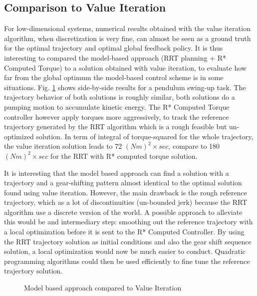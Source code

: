 \subsection{Comparison to Value Iteration}

For low-dimensional systems, numerical results obtained with the value iteration algorithm, when discretization is very fine, can almost be seen as a ground truth for the optimal trajectory and optimal global feedback policy. It is thus interesting to compared the model-based approach (RRT planning + R* Computed Torque) to a solution obtained with value iteration, to evaluate how far from the global optimum the model-based control scheme is in some situations. Fig. \ref{fig:vs} shows side-by-side results for a pendulum swing-up task. The trajectory behavior of both solutions is roughly similar, both solutions do a pumping motion to accumulate kinetic energy. The R* Computed Torque controller however apply torques more aggressively, to track the reference trajectory generated by the RRT algorithm which is a rough feasible but un-optimized solution. In term of integral of torque-squared for the whole trajectory, the value iteration solution leads to 72 $\left(Nm\right)^2 \times sec$, compare to 180 $\left(Nm\right)^2 \times sec$ for the RRT with R* computed torque solution.

It is interesting that the model based approach can find a solution with a trajectory and a gear-shifting pattern almost identical to the optimal solution found using value iteration. However, the main drawback is the rough reference trajectory, which as a lot of discontinuities (un-bounded jerk) because the RRT algorithm use a discrete version of the world. A possible approach to alleviate this would be and intermediary step: smoothing out the reference trajectory with a local optimization before it is sent to the R* Computed Controller. By using the RRT trajectory solution as initial conditions and also the gear shift sequence solution, a local optimization would now be much easier to conduct. Quadratic programming algorithms could then be used efficiently to fine tune the reference trajectory solution.

\begin{figure}[H]
        \centering
        \caption{Model based approach compared to Value Iteration}
				\label{fig:vs}
\end{figure}


